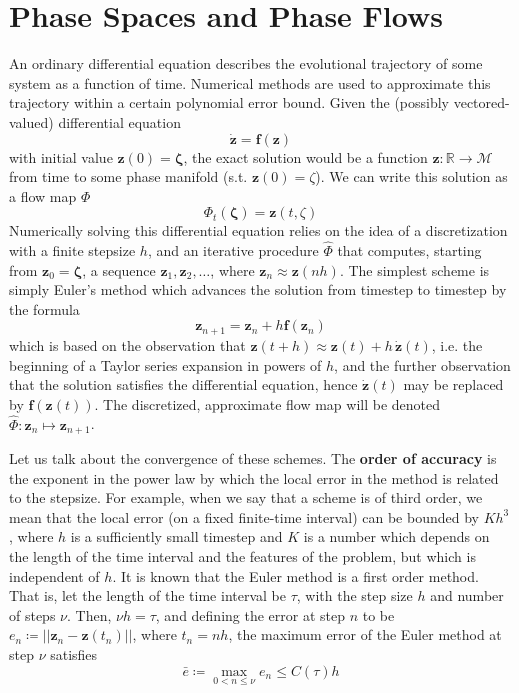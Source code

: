 \section{Phase Spaces and Phase Flows}

    An ordinary differential equation describes the evolutional trajectory of some system as a function of time. Numerical methods are used to approximate this trajectory within a certain polynomial error bound. Given the (possibly vectored-valued) differential equation 
    \begin{equation}
      \mathbf{\dot{z}} = \mathbf{f}(\mathbf{z})
    \end{equation}
    with initial value $\mathbf{z}(0) = \boldsymbol{\zeta}$, the exact solution would be a function $\mathbf{z}: \mathbb{R} \longrightarrow \mathcal{M}$ from time to some phase manifold (s.t. $\mathbf{z}(0) = \zeta$). We can write this solution as a flow map $\Phi$
    \begin{equation}
      \Phi_t (\boldsymbol{\zeta}) = \mathbf{z}(t, \zeta)
    \end{equation}
    Numerically solving this differential equation relies on the idea of a discretization with a finite stepsize $h$, and an iterative procedure $\hat{\Phi}$ that computes, starting from $\mathbf{z}_0 = \boldsymbol{\zeta}$, a sequence $\mathbf{z}_1, \mathbf{z}_2, \ldots$, where $\mathbf{z}_n \approx \mathbf{z}(n h)$. The simplest scheme is simply Euler's method which advances the solution from timestep to timestep by the formula 
    \begin{equation}
      \mathbf{z}_{n+1} = \mathbf{z}_n + h \mathbf{f}(\mathbf{z}_n)
    \end{equation}
    which is based on the observation that $\mathbf{z}(t + h) \approx \mathbf{z}(t) + h\, \boldsymbol{\dot{z}}(t)$, i.e. the beginning of a Taylor series expansion in powers of $h$, and the further observation that the solution satisfies the differential equation, hence $\boldsymbol{\dot{z}}(t)$ may be replaced by $\mathbf{f}(\mathbf{z}(t))$. The discretized, approximate flow map will be denoted $\hat{\Phi}: \mathbf{z}_n \mapsto \mathbf{z}_{n+1}$. 

    Let us talk about the convergence of these schemes. The \textbf{order of accuracy} is the exponent in the power law by which the local error in the method is related to the stepsize. For example, when we say that a scheme is of third order, we mean that the local error (on a fixed finite-time interval) can be bounded by $K h^3$, where $h$ is a sufficiently small timestep and $K$ is a number which depends on the length of the time interval and the features of the problem, but which is independent of $h$. It is known that the Euler method is a first order method. That is, let the length of the time interval be $\tau$, with the step size $h$ and number of steps $\nu$. Then, $\nu h = \tau$, and defining the error at step $n$ to be $e_n \coloneqq ||\mathbf{z}_n - \mathbf{z}(t_n)||$, where $t_n = n h$, the maximum error of the Euler method at step $\nu$ satisfies
    \begin{equation}
      \bar{e} \coloneqq \max_{0 < n \leq \nu} e_n \leq C(\tau) h
    \end{equation}

